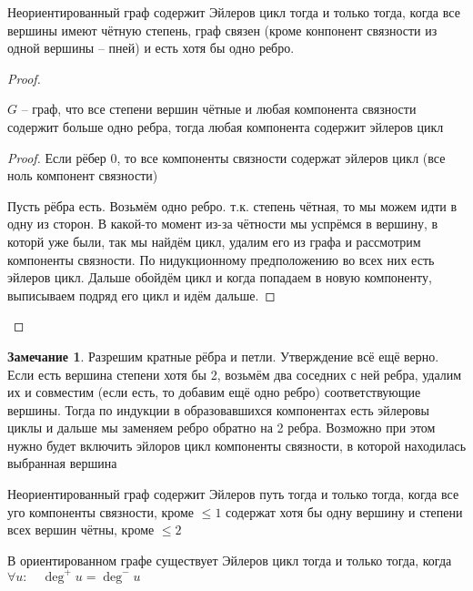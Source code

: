 \documentclass{book}
\theoremstyle{definition}
\newtheorem*{note}{Замечание}
\begin{document}
    \begin{theorem}
        Неориентированный граф содержит Эйлеров цикл тогда и только тогда, когда все вершины имеют чётную степень, граф связен (кроме конпонент связности из одной вершины -- пней) и есть хотя бы одно ребро.
    \end{theorem}
    \begin{proof}
       \begin{statement}
           $G$ -- граф, что все степени вершин чётные и любая компонента связности содержит больше одно ребра, тогда любая компонента содержит эйлеров цикл
       \end{statement} 
       \begin{proof}
           Если рёбер 0, то все компоненты связности содержат эйлеров цикл (все ноль компонент связности)

           Пусть рёбра есть. Возьмём одно ребро. т.к. степень чётная, то мы можем идти в одну из сторон. В какой-то момент из-за чётности мы успрёмся в вершину, в которй уже были, так мы найдём цикл, удалим его из графа и рассмотрим компоненты связности. По нидукционному предположению во всех них есть эйлеров цикл. Дальше обойдём цикл и когда попадаем в новую компоненту, выписываем подряд его цикл и идём дальше.
       \end{proof}
    \end{proof}
       \begin{note}
           Разрешим кратные рёбра и петли. Утверждение всё ещё верно. Если есть вершина степени хотя бы 2, возьмём два соседних с ней ребра, удалим их и совместим (если есть, то добавим ещё одно ребро) соответствующие вершины. Тогда по индукции в образовавшихся компонентах есть эйлеровы циклы и дальше мы заменяем ребро обратно на 2 ребра. Возможно при этом нужно будет включить эйлоров цикл компоненты связности, в которой находилась выбранная вершина
       \end{note}

       \begin{corollary}
           Неориентированный граф содержит Эйлеров путь тогда и только тогда, когда все уго компоненты связности, кроме $\leqslant 1$ содержат хотя бы одну вершину и степени всех вершин чётны, кроме $\leqslant 2$
       \end{corollary}

       \begin{theorem}
           В ориентированном графе существует Эйлеров цикл тогда и только тогда, когда $\forall u:\quad \deg^+ u = \deg^-u$
       \end{theorem}
\end{document}
